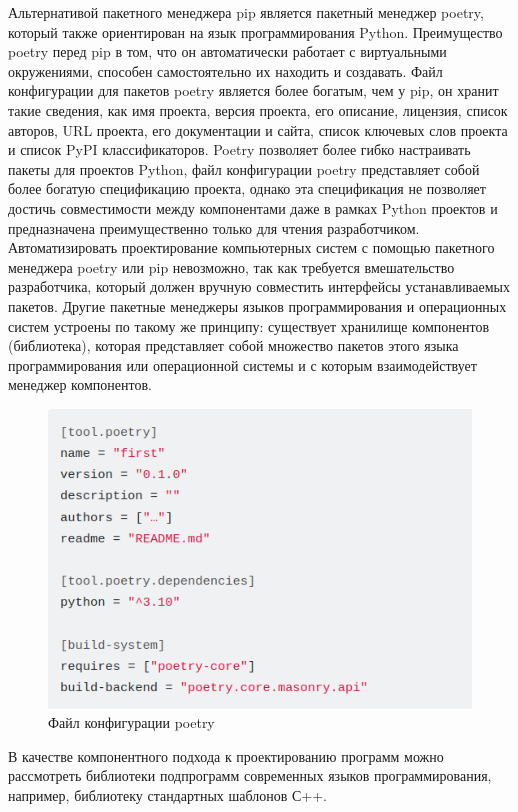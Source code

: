 Альтернативой пакетного менеджера pip является пакетный менеджер poetry, который также ориентирован на язык программирования Python. Преимущество poetry перед pip в том, что он автоматически работает с виртуальными окружениями, способен самостоятельно их находить и создавать. Файл конфигурации для пакетов poetry является более богатым, чем у pip, он хранит такие сведения, как имя проекта, версия проекта, его описание, лицензия, список авторов, URL проекта, его документации и сайта, список ключевых слов проекта и список PyPI классификаторов. Poetry позволяет более гибко настраивать пакеты для проектов Python, файл конфигурации poetry представляет собой более богатую спецификацию проекта, однако эта спецификация не позволяет достичь совместимости между компонентами даже в рамках Python проектов и предназначена преимущественно только для чтения разработчиком. Автоматизировать проектирование компьютерных систем с помощью пакетного менеджера poetry или pip невозможно, так как требуется вмешательство разработчика, который должен вручную совместить интерфейсы устанавливаемых пакетов. Другие пакетные менеджеры языков программирования и операционных систем устроены по такому же принципу: существует хранилище компонентов (библиотека), которая представляет собой множество пакетов этого языка программирования или операционной системы и с которым взаимодействует менеджер компонентов.

\begin{figure}[H]
	\includegraphics[scale=0.7]{author/part5/figures/poetry.png}
	\caption{Файл конфигурации poetry}
	\label{fig:poetry}
\end{figure}

В качестве компонентного подхода к проектированию программ можно рассмотреть библиотеки подпрограмм современных языков программирования, например, библиотеку стандартных шаблонов С++.

